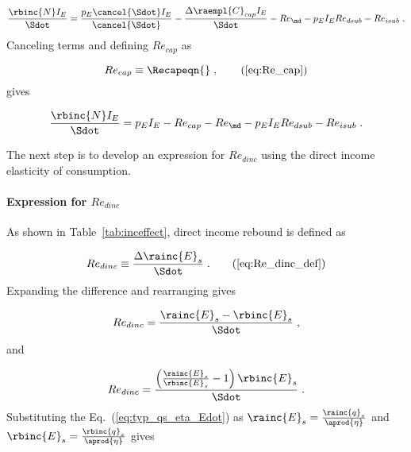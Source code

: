 \begin{equation}
  \frac{\rbinc{N} I_E}{\Sdot} = \frac{p_E \cancel{\Sdot} I_E}{\cancel{\Sdot}}
                                - \frac{\Delta \raempl{C}_{cap} I_E}{\Sdot}
                                - Re_{\md}
                                - p_E I_E Re_{dsub}
                                - Re_{isub} \; .
\end{equation}
%
Canceling terms and defining $Re_{cap}$ as

\begin{equation}
  Re_{cap} \equiv \Recapeqn{} \; , \tag{\ref{eq:Re_cap}}
\end{equation}
%
gives

\begin{equation} \label{eq:N_dot_I_E_Sdot}
  \frac{\rbinc{N} I_E}{\Sdot} = p_E I_E
                                - Re_{cap}
                                - Re_{\md}
                                - p_E I_E Re_{dsub}
                                - Re_{isub} \; .
\end{equation}

The next step is to develop an expression for $Re_{dinc}$
using the direct income elasticity of consumption.


\paragraph{Expression for $Re_{dinc}$}
\label{sec:Re_dinc}

As shown in Table~\ref{tab:inceffect}, direct income rebound is defined as

\begin{equation}
  Re_{dinc} \equiv \frac{\Delta \rainc{E}_s}{\Sdot} \; . \tag{\ref{eq:Re_dinc_def}}
\end{equation}
%
Expanding the difference and rearranging gives

\begin{equation}
  Re_{dinc} = \frac{\rainc{E}_s - \rbinc{E}_s}{\Sdot} \; , 
\end{equation}
%
and

\begin{equation}
  Re_{dinc} = \frac{\left( \frac{\rainc{E}_s}{\rbinc{E}_s} - 1  \right) \rbinc{E}_s}{\Sdot} \; .
\end{equation}
%
Substituting the Eq.~(\ref{eq:typ_qs_eta_Edot}) as
$\rainc{E}_s = \frac{\rainc{q}_s}{\aprod{\eta}}$ and  
$\rbinc{E}_s = \frac{\rbinc{q}_s}{\aprod{\eta}}$ gives

